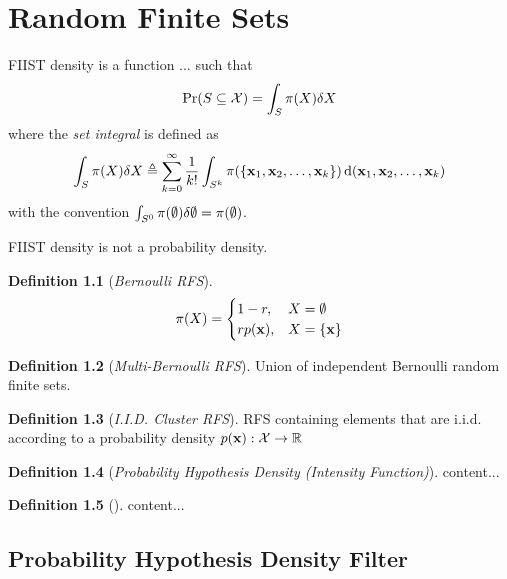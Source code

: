 \documentclass[a4paper]{scrreprt}
\theoremstyle{theorem}
\theoremstyle{definition}
\newtheorem{defn}{Definition}
\begin{document}
\chapter{Random Finite Sets}\label{ch:random_finite_sets}

FIIST density is a function ... such that 
\begin{equation}\label{eq:fiist_density}
	\mathrm{Pr}(S \subseteq \mathcal{X}) = \int_S \pi(X) \dsx[X]
\end{equation}
where the \emph{set integral} is defined as
\begin{equation}\label{eq:set_integral}
	\int_S \pi(X) \dsx[X] \triangleq \sum_{k=0}^{\infty}\frac{1}{k!}\int_{S^k} \pi(\Bqty{\inVar_1, \inVar_2, \ldots, \inVar_k}) \dx[(\inVar_1, \inVar_2, \ldots, \inVar_k)]
\end{equation}
with the convention \( \int_{S^0} \pi(\emptyset) \dsx[\emptyset] = \pi(\emptyset) \).

FIIST density is not a probability density.

\begin{defn}[\emph{Bernoulli RFS}]
\begin{equation}\label{eq:bernoulli_rfs}
	\pi(X) = 
	\begin{cases}
	1 - r, 			& X = \emptyset \\
	r p(\stVar), 	& X = \Bqty{\stVar}
	\end{cases}
\end{equation}
\end{defn}

\begin{defn}[\emph{Multi-Bernoulli RFS}]
	Union of independent Bernoulli random finite sets.
\end{defn}

\begin{defn}[\emph{I.I.D. Cluster RFS}]
	RFS containing elements that are i.i.d. according to a probability density \( p(\stVar): \stSp\to\R \)
\end{defn}

\begin{defn}[\emph{Probability Hypothesis Density (Intensity Function)}]
	content...
\end{defn}

\begin{defn}[]
	content...
\end{defn}



\section{Probability Hypothesis Density Filter}
\end{document}
